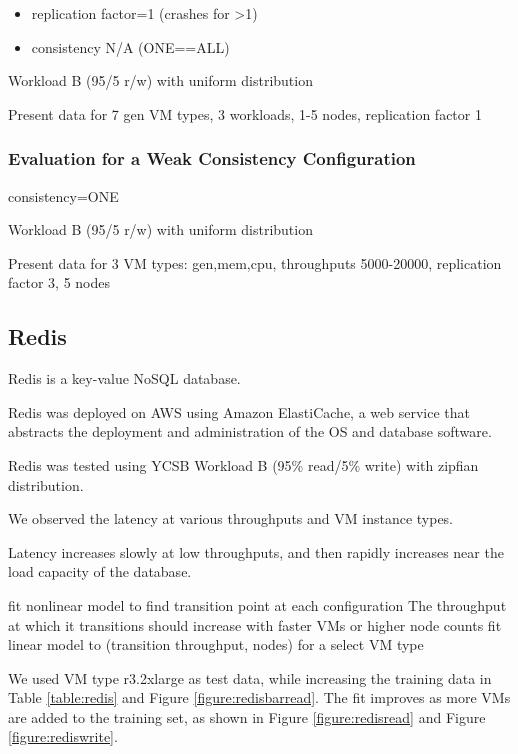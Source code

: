 \documentclass{acm_proc_article-sp}
\begin{document}
\begin{itemize}
\item replication factor=1 (crashes for >1)
\item consistency N/A (ONE==ALL)
\end{itemize}
Workload B (95/5 r/w) with uniform distribution

Present data for
7 gen VM types, 3 workloads, 1-5 nodes, replication factor 1

\subsubsection{Evaluation for a Weak Consistency Configuration}

consistency=ONE

Workload B (95/5 r/w) with uniform distribution

Present data for
3 VM types: gen,mem,cpu, throughputs 5000-20000, replication factor 3, 5 nodes

\subsection{Redis}

Redis is a key-value NoSQL database.

Redis was deployed on AWS using Amazon ElastiCache, a web service that abstracts the deployment and administration of the OS and database software.

Redis was tested using YCSB Workload B (95\% read/5\% write) with zipfian distribution.

We observed the latency at various throughputs and VM instance types.

Latency increases slowly at low throughputs, and then rapidly increases near the load capacity of the database.

fit nonlinear model to find transition point at each configuration
The throughput at which it transitions should increase with faster VMs or higher node counts  
fit linear model to (transition throughput, nodes) for a select VM type

We used VM type r3.2xlarge as test data, while increasing the training data in Table \ref{table:redis} and Figure \ref{figure:redisbarread}.  The fit improves as more VMs are added to the training set, as shown in Figure \ref{figure:redisread} and Figure \ref{figure:rediswrite}.
\end{document}
